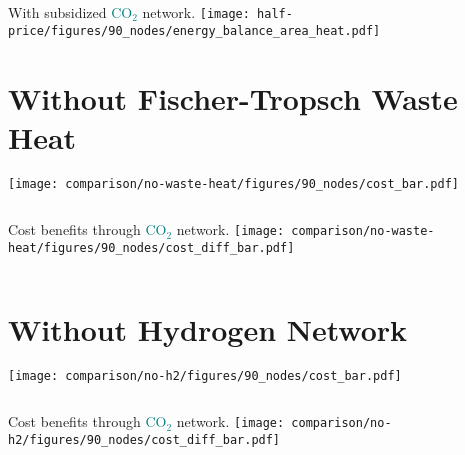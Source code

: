 \documentclass[12pt, aspectratio=169]{beamer}
\newcommand{\carbon}{\textcolor{teal}{CO$_2$}}
\begin{document}
\begin{frame}
    \begin{center}
    With subsidized \carbon{} network.
    \texttt{[image: half-price/figures/90\_nodes/energy\_balance\_area\_heat.pdf]}
    \end{center}
\end{frame}

\section*{Without Fischer-Tropsch Waste Heat}

\begin{frame}
    \texttt{[image: comparison/no-waste-heat/figures/90\_nodes/cost\_bar.pdf]}
\end{frame}

\begin{frame}
    \begin{columns}
        Cost benefits through \carbon{} network.
        \texttt{[image: comparison/no-waste-heat/figures/90\_nodes/cost\_diff\_bar.pdf]}
    \end{columns}
\end{frame}

\section{Without Hydrogen Network}

\begin{frame}
    \texttt{[image: comparison/no-h2/figures/90\_nodes/cost\_bar.pdf]}
\end{frame}

\begin{frame}
    \begin{columns}
        Cost benefits through \carbon{} network.
        \texttt{[image: comparison/no-h2/figures/90\_nodes/cost\_diff\_bar.pdf]}
    \end{columns}
\end{frame}
\end{document}
